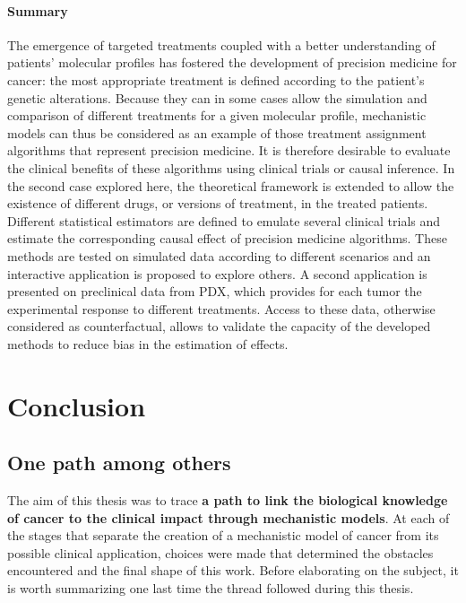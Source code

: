 \documentclass[a4paper,12pt,twoside,onecolumn,openright,final,oldfontcommands]{memoir}
\let\BeginKnitrBlock\begin \let\EndKnitrBlock\end
\begin{document}
\BeginKnitrBlock{conclubox}
\subsubsection*{Summary}\label{summary-8}

The emergence of targeted treatments coupled with a better understanding
of patients' molecular profiles has fostered the development of
precision medicine for cancer: the most appropriate treatment is defined
according to the patient's genetic alterations. Because they can in some
cases allow the simulation and comparison of different treatments for a
given molecular profile, mechanistic models can thus be considered as an
example of those treatment assignment algorithms that represent
precision medicine. It is therefore desirable to evaluate the clinical
benefits of these algorithms using clinical trials or causal inference.
In the second case explored here, the theoretical framework is extended
to allow the existence of different drugs, or versions of treatment, in
the treated patients. Different statistical estimators are defined to
emulate several clinical trials and estimate the corresponding causal
effect of precision medicine algorithms. These methods are tested on
simulated data according to different scenarios and an interactive
application is proposed to explore others. A second application is
presented on preclinical data from PDX, which provides for each tumor
the experimental response to different treatments. Access to these data,
otherwise considered as counterfactual, allows to validate the capacity
of the developed methods to reduce bias in the estimation of effects.
\EndKnitrBlock{conclubox}

\chapter*{Conclusion}\label{conclusion}

\section{One path among others}\label{one-path-among-others}

The aim of this thesis was to trace \textbf{a path to link the
biological knowledge of cancer to the clinical impact through
mechanistic models}. At each of the stages that separate the creation of
a mechanistic model of cancer from its possible clinical application,
choices were made that determined the obstacles encountered and the
final shape of this work. Before elaborating on the subject, it is worth
summarizing one last time the thread followed during this thesis.
\end{document}
